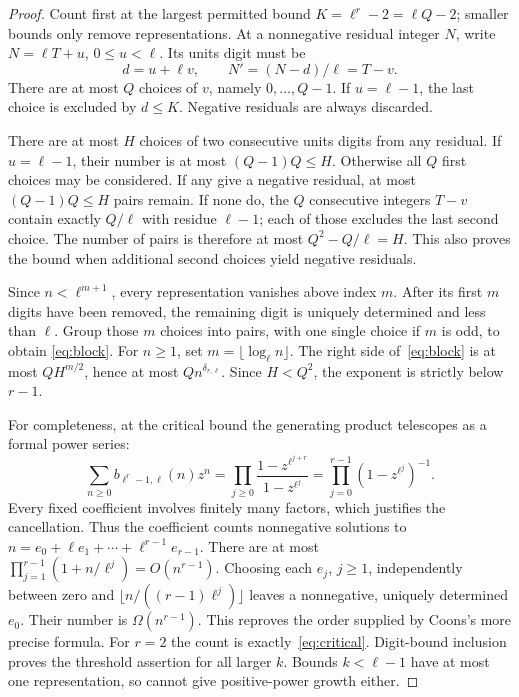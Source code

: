\documentclass[11pt]{article}
\begin{document}
\begin{proof}
Count first at the largest permitted bound $K=\ell^r-2=\ell Q-2$;
smaller bounds only remove representations.
At a nonnegative residual integer $N$, write $N=\ell T+u$,
$0\le u<\ell$. Its units digit must be
\[
 d=u+\ell v,\qquad N'=(N-d)/\ell=T-v.
\]
There are at most $Q$ choices of $v$, namely $0,\ldots,Q-1$.
If $u=\ell-1$, the last choice is excluded by $d\le K$.
Negative residuals are always discarded.

There are at most $H$ choices of two consecutive units digits from
any residual. If $u=\ell-1$, their number is at most
$(Q-1)Q\le H$. Otherwise all $Q$ first choices may be considered.
If any give a negative residual, at most $(Q-1)Q\le H$ pairs remain.
If none do, the $Q$ consecutive integers $T-v$ contain exactly
$Q/\ell$ with residue $\ell-1$; each of those excludes the last
second choice. The number of pairs is therefore at most
$Q^2-Q/\ell=H$. This also proves the bound when additional second
choices yield negative residuals.

Since $n<\ell^{m+1}$, every representation vanishes above index $m$.
After its first $m$ digits have been removed, the remaining digit is
uniquely determined and less than $\ell$. Group those $m$ choices
into pairs, with one single choice if $m$ is odd, to obtain
\eqref{eq:block}. For $n\ge1$, set $m=\lfloor\log_\ell n\rfloor$.
The right side of~\eqref{eq:block} is at most $QH^{m/2}$, hence
at most $Qn^{\delta_{r,\ell}}$. Since $H<Q^2$, the exponent is
strictly below $r-1$.

For completeness, at the critical bound the generating product
telescopes as a formal power series:
\begin{equation}\label{eq:telescoping}
 \sum_{n\ge0}b_{\ell^r-1,\ell}(n)z^n
 =\prod_{j\ge0}\frac{1-z^{\ell^{j+r}}}{1-z^{\ell^j}}
 =\prod_{j=0}^{r-1}(1-z^{\ell^j})^{-1}.
\end{equation}
Every fixed coefficient involves finitely many factors, which justifies
the cancellation. Thus the coefficient counts nonnegative solutions
to $n=e_0+\ell e_1+\cdots+\ell^{r-1}e_{r-1}$.
There are at most $\prod_{j=1}^{r-1}(1+n/\ell^j)=O(n^{r-1})$.
Choosing each $e_j$, $j\ge1$, independently between zero and
$\lfloor n/((r-1)\ell^j)\rfloor$ leaves a nonnegative, uniquely
determined $e_0$. Their number is $\Omega(n^{r-1})$.
This reproves the order supplied by Coons's more precise formula.
For $r=2$ the count is exactly~\eqref{eq:critical}.
Digit-bound inclusion proves the threshold assertion for all larger
$k$. Bounds $k<\ell-1$ have at most one representation, so cannot
give positive-power growth either.
\end{proof}
\end{document}
